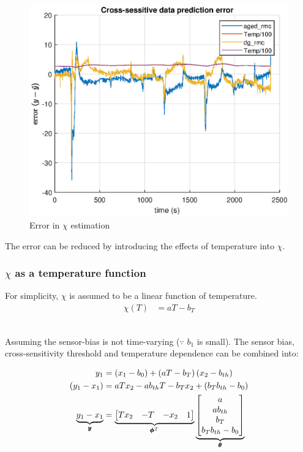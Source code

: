 \begin{figure}[H]
    \centering
    \includegraphics[width = 0.5 \textwidth]{./figs/chi_est/chi_error.eps}
    \caption{Error in $\chi$ estimation}
\end{figure}

The error can be reduced by introducing the effects of temperature into $\chi$.


\subsubsection{$\chi$ as a temperature function}
For simplicity, $\chi$ is assumed to be a linear function of temperature.
\begin{align*}
    \chi(T) &= a T - b_T
\end{align*}

\\
Assuming the sensor-bias is not time-varying ($\because$ $b_1$ is small). The
sensor bias, cross-sensitivity threshold and temperature dependence can be
combined into:

\begin{align*}
    y_1 &=  \left( x_1 - b_0 \right) + \left( aT - b_{T} \right) \left( x_2 - b_{th} \right)\\
    \left( y_1 - x_1 \right) &= a T x_2 - a b_{th} T - b_{T} x_2 + (b_T b_{th} - b_0)\\
    \underbrace{y_1 - x_1}_{\pmb y} &= \underbrace{\begin{bmatrix} T x_2 & -T & -x_2 & 1 \end{bmatrix}}_{\pmb \phi^T} \underbrace{\begin{bmatrix} a \\ a b_{th} \\ b_T \\ b_T b_{th} - b_0 \end{bmatrix}}_{\pmb \theta}\\
\end{align*}

